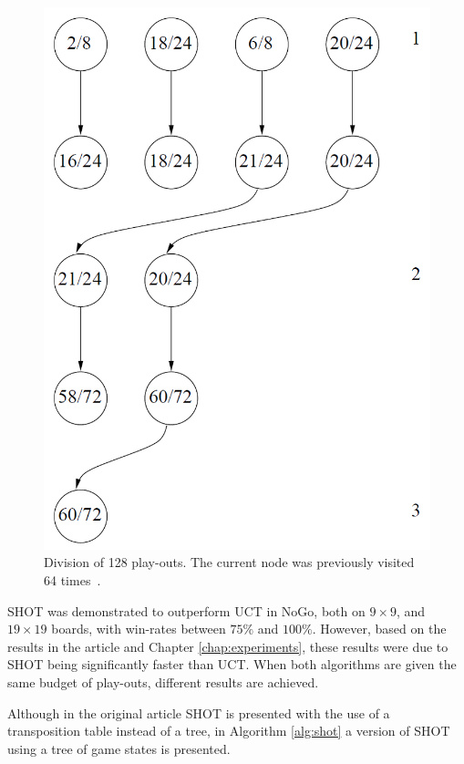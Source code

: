 \documentclass{kecsmstr}
\begin{document}
\begin{figure}[h]
	\centering
	\includegraphics[width=.4\textwidth]{img/shot_topoffs.png}
	\caption{Division of 128 play-outs. The current node was previously visited 64 times~\protect{}.}
	\label{fig:shot-topoffs}
\end{figure}

SHOT was demonstrated to outperform UCT in NoGo, both on $9\times9$, and $19\times19$ boards, with win-rates between $75\%$ and $100\%$. However, based on the results in the article and Chapter \ref{chap:experiments}, these results were due to SHOT being significantly faster than UCT. When both algorithms are given the same budget of play-outs, different results are achieved.

Although in the original article SHOT is presented with the use of a transposition table instead of a tree, in Algorithm \ref{alg:shot} a version of SHOT using a tree of game states is presented.
\end{document}
